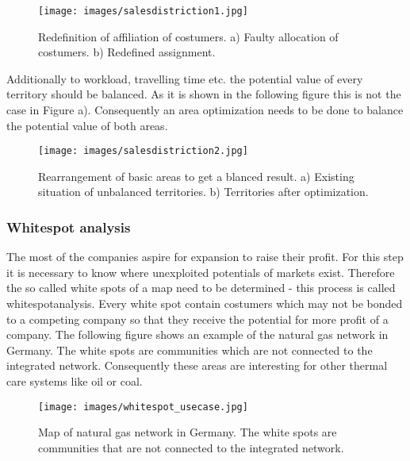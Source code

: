 \begin{figure}[H]
	\centering
	\texttt{[image: images/salesdistriction1.jpg]}
	\caption[Redefinition of affiliation of costumers.]{Redefinition of affiliation of costumers. a) Faulty allocation of costumers. b) Redefined assignment. \cite{zimtec}}
\end{figure} 

Additionally to workload, travelling time etc. the potential value of every territory should be balanced. As it is shown in the following figure this is not the case in Figure a). Consequently an area optimization needs to be done to balance the potential value of both areas.

\begin{figure}[H]
	\centering
	\texttt{[image: images/salesdistriction2.jpg]}
	\caption[Rearrangement of basic areas to get a blanced result.]{Rearrangement of basic areas to get a blanced result. a) Existing situation of unbalanced territories. b) Territories after optimization. \cite{zimtec}}
\end{figure} 

\subsubsection{Whitespot analysis}
The most of the companies aspire for expansion to raise their profit. For this step it is necessary to know where unexploited potentials of markets exist. Therefore the so called white spots of a map need to be determined - this process is called whitespotanalysis. Every white spot contain costumers which may not be bonded to a competing company so that they receive the potential for more profit of a company. The following figure shows an example of the natural gas network in Germany. The white spots are communities which are not connected to the integrated network. Consequently these areas are interesting for other thermal care systems like oil or coal. 

\begin{figure}[H]
	\centering
	\texttt{[image: images/whitespot\_usecase.jpg]}
	\caption[Map of natural gas network in Germany for representing whit spots.]{Map of natural gas network in Germany. The white spots are communities that are not connected to the integrated network. \cite{tappert}}
\end{figure}  